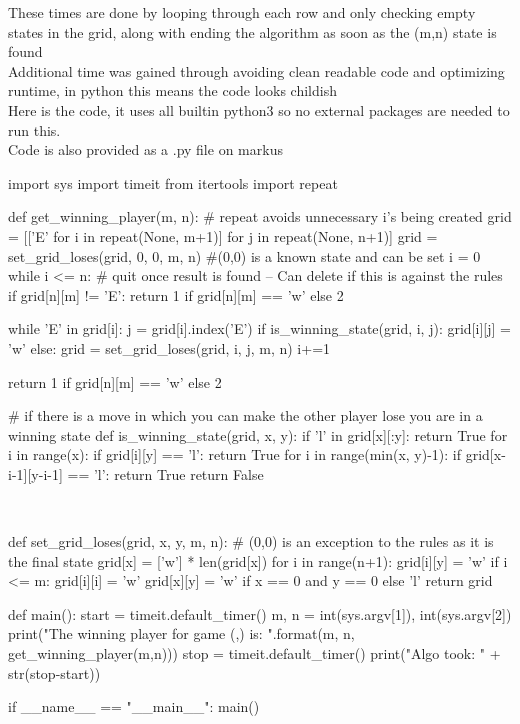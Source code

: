 \documentclass[a4paper,12pt]{article}
\begin{document}
\begin{enumerate}
		These times are done by looping through each row and only checking empty states in the grid, along with ending the algorithm as soon as the (m,n) state is found \\
		
		Additional time was gained through avoiding clean readable code and optimizing runtime, in python this means the code looks childish\\
		
		
		Here is the code, it uses all builtin python3 so no external packages are needed to run this.\\
		Code is also provided as a .py file on markus\\
		
		\begin{python}
		import sys
		import timeit
		from itertools import repeat
		
		
		def get_winning_player(m, n):
			# repeat avoids unnecessary i's being created
			grid = [['E' for i in repeat(None, m+1)] for j in repeat(None, n+1)]
			grid = set_grid_loses(grid, 0, 0, m, n) #(0,0) is a known state and can be set
			i = 0
			while i <= n:
				# quit once result is found -- Can delete if this is against the rules
				if grid[n][m] != 'E':
					return 1 if grid[n][m] == 'w' else 2
			
				while 'E' in grid[i]:
					j = grid[i].index('E')
					if is_winning_state(grid, i, j):
						grid[i][j] = 'w'
					else:
						grid = set_grid_loses(grid, i, j, m, n)
				i+=1
			
			return 1 if grid[n][m] == 'w' else 2
		\end{python}
	
		\begin{python}
		# if there is a move in which you can make the other player lose you are in a winning state
		def is_winning_state(grid, x, y):
			if 'l' in grid[x][:y]:
				return True
			for i in range(x):
				if grid[i][y] == 'l':
					return True
			for i in range(min(x, y)-1):
				if grid[x-i-1][y-i-1] == 'l':
					return True
			return False
		\end{python}~\\
	
		\begin{python}
		def set_grid_loses(grid, x, y, m, n):
			# (0,0) is an exception to the rules as it is the final state
			grid[x] = ['w'] * len(grid[x])
			for i in range(n+1):
				grid[i][y] = 'w'
				if i <= m:
					grid[i][i] = 'w'
			grid[x][y] = 'w' if x == 0 and y == 0 else 'l'
			return grid
		\end{python}
	
		\begin{python}
		def main():
			start = timeit.default_timer()
			m, n = int(sys.argv[1]), int(sys.argv[2])
			print("The winning player for game ({},{}) is: {}".format(m, n, get_winning_player(m,n)))
			stop = timeit.default_timer()
			print("Algo took: " + str(stop-start))
		
		
		if __name__ == "__main__":
			main()
		\end{python}
		
	\end{enumerate}
	
\end{document}
